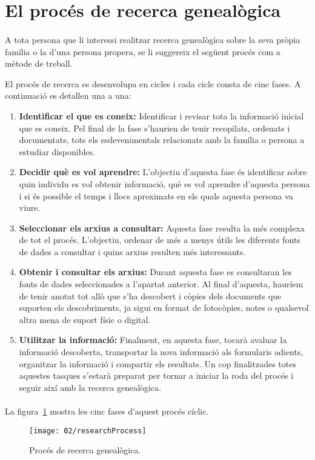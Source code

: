 \section{El procés de recerca genealògica}

    \paragraph{}
    A tota persona que li interessi realitzar recerca genealògica sobre la seva pròpia família o la d'una persona propera, se li suggereix el següent procés com a mètode de treball.

    El procés de recerca es desenvolupa en cicles i cada cicle consta de cinc fases. A continuació es detallen una a una:

    \begin{enumerate}
        \item \textbf{Identificar el que es coneix:} Identificar i revisar tota la informació inicial que es coneix. Pel final de la fase s’haurien de tenir recopilats, ordenats i documentats, tots els esdevenimentals relacionats amb la família o persona a estudiar disponibles.
        \item \textbf{Decidir què es vol aprendre:} L’objectiu d’aquesta fase és identificar sobre quin individu es vol obtenir informació, què es vol aprendre d’aquesta persona i si és possible el temps i llocs aproximats en els quals aquesta persona va viure.
        \item \textbf{Seleccionar els arxius a consultar:} Aquesta fase resulta la més complexa de tot el procés. L’objectiu, ordenar de més a menys útils les diferents fonts de dades a consultar i quins arxius resulten més interessants.
        \item \textbf{Obtenir i consultar els arxius:} Durant aquesta fase es consultaran les fonts de dades seleccionades a l’apartat anterior. Al final d’aquesta, hauríem de tenir anotat tot allò que s’ha descobert i còpies dels documents que suporten els descobriments, ja sigui en format de fotocòpies, notes o qualsevol altra mena de suport físic o digital.
        \item \textbf{Utilitzar la informació:} Finalment, en aquesta fase, tocarà avaluar la informació descoberta, transportar la nova informació als formularis adients, or\-ga\-nit\-zar la informació i compartir els resultats. Un cop finalitzades totes aquestes tasques s'estarà preparat per tornar a iniciar la roda del procés i seguir així amb la recerca genealògica.
    \end{enumerate}

    \paragraph{}
    La figura~\ref{fig:researchProcess} mostra les cinc fases d'aquest procés cíclic.

    \begin{figure}
            \texttt{[image: 02/researchProcess]}
            \centering
            \caption{Procés de recerca genealògica.\label{fig:researchProcess}}
    \end{figure}
